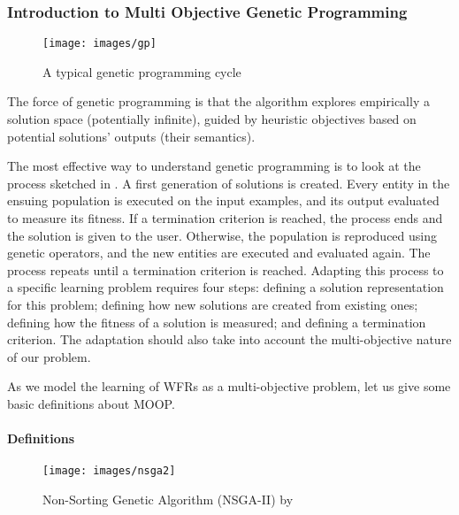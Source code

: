 \subsubsection{Introduction to Multi Objective Genetic Programming}

\begin{figure}[ht]
	\centering
	\texttt{[image: images/gp]}
	\caption{A typical genetic programming cycle}
	\label{fig:gp}
\end{figure}	
The force of genetic programming is that the algorithm explores empirically a solution space (potentially infinite), guided by heuristic objectives based on potential solutions' outputs (\ie their semantics).

The most effective way to understand genetic programming is to look at the process sketched in . A first generation of solutions is created. Every entity in the ensuing population is executed on the  input examples, and its output evaluated to measure its fitness. If a termination criterion is reached, the process ends and the solution is given to the user. Otherwise, the population is reproduced using genetic operators, and the new entities are executed and evaluated again. The process repeats until a termination criterion is reached.
Adapting this process to a specific learning problem requires four steps: defining a solution representation for this problem; defining how new solutions are created from existing ones; defining how the fitness of a solution is measured; and defining a termination criterion. The adaptation should also take into account the multi-objective nature of our problem.

As we model the learning of WFRs as a multi-objective problem, let us give some basic definitions about MOOP.


\paragraph{Definitions}
\begin{figure}[h]
	\centering
	\texttt{[image: images/nsga2]}
	\caption{Non-Sorting Genetic Algorithm (NSGA-II) by \cite{deb2000}}
	\label{fig:nsga2}
\end{figure}

